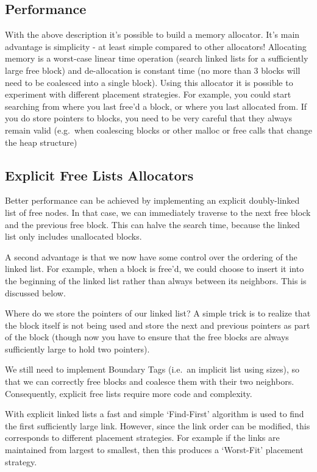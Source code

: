 \subsection{Performance}

With the above description it's possible to build a memory allocator. It's main advantage is simplicity - at least simple compared to other allocators! Allocating memory is a worst-case linear time operation (search linked lists for a sufficiently large free block) and de-allocation is constant time (no more than 3 blocks will need to be coalesced into a single block). Using this allocator it is possible to experiment with different placement strategies. For example, you could start searching from where you last free'd a block, or where you last allocated from. If you do store pointers to blocks, you need to be very careful that they always remain valid (e.g.~when coalescing blocks or other malloc or free calls that change the heap structure)

\subsection{Explicit Free Lists Allocators}

Better performance can be achieved by implementing an explicit doubly-linked list of free nodes. In that case, we can immediately traverse to the next free block and the previous free block. This can halve the search time, because the linked list only includes unallocated blocks.

A second advantage is that we now have some control over the ordering of the linked list. For example, when a block is free'd, we could choose to insert it into the beginning of the linked list rather than always between its neighbors. This is discussed below.

Where do we store the pointers of our linked list? A simple trick is to realize that the block itself is not being used and store the next and previous pointers as part of the block (though now you have to ensure that the free blocks are always sufficiently large to hold two pointers).

We still need to implement Boundary Tags (i.e.~an implicit list using sizes), so that we can correctly free blocks and coalesce them with their two neighbors. Consequently, explicit free lists require more code and complexity.

With explicit linked lists a fast and simple `Find-First' algorithm is used to find the first sufficiently large link. However, since the link order can be modified, this corresponds to different placement strategies. For example if the links are maintained from largest to smallest, then this produces a `Worst-Fit' placement strategy.


